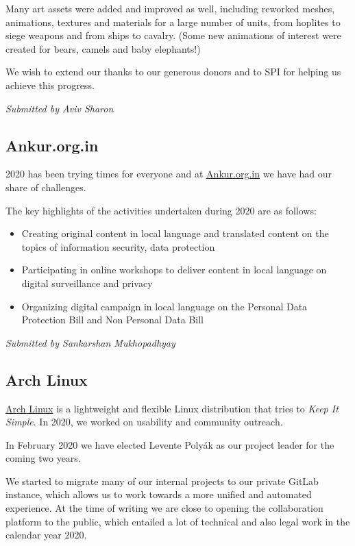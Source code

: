 \documentclass[a4paper]{report}
\begin{document}
Many art assets were added and improved as well, including reworked meshes, animations, textures and materials for a large number of units, from hoplites to siege weapons and from ships to cavalry. (Some new animations of interest were created for bears, camels and baby elephants!)

We wish to extend our thanks to our generous donors and to SPI for helping us achieve this progress.

{\em Submitted by Aviv Sharon}

\subsection{Ankur.org.in}

2020 has been trying times for everyone and at \href{http://ankur.org.in/}{Ankur.org.in} we have had our share of challenges.

The key highlights of the activities undertaken during 2020 are as follows:

\begin{itemize}

\item Creating original content in local language and translated content on the topics of information security, data protection
\item Participating in online workshops to deliver content in local language on digital surveillance and privacy
\item Organizing digital campaign in local language on the Personal Data Protection Bill and Non Personal Data Bill

\end{itemize}

{\em Submitted by Sankarshan Mukhopadhyay}

\subsection{Arch Linux}

\href{https://archlinux.org/}{Arch Linux} is a lightweight and flexible Linux distribution that tries to \textit{Keep It Simple}.  In 2020, we worked on usability and community outreach.

In February 2020 we have elected Levente Polyák as our project leader for the coming two years.

We started to migrate many of our internal projects to our private GitLab instance, which allows us to work towards a more unified and automated experience. At the time of writing we are close to opening the collaboration platform to the public, which entailed a lot of technical and also legal work in the calendar year 2020.
\end{document}
